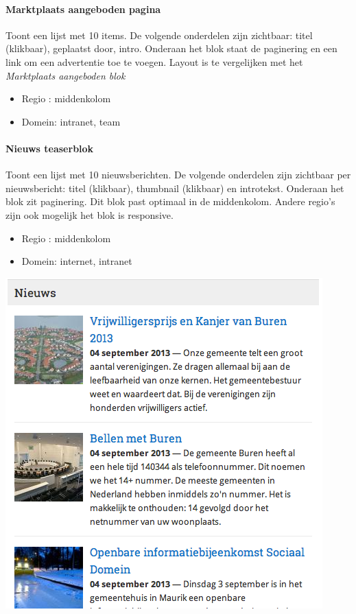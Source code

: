 \paragraph{Marktplaats aangeboden pagina}

Toont een lijst met 10 items. De volgende onderdelen zijn zichtbaar: titel (klikbaar), geplaatst door, intro. Onderaan het blok staat de paginering en een link om een advertentie toe te voegen. Layout is te vergelijken met het \emph{Marktplaats aangeboden blok}

\begin{itemize}
\item Regio : middenkolom
\item Domein: intranet, team
\end{itemize}

\paragraph{Nieuws teaserblok}

Toont een lijst met 10 nieuwsberichten. De volgende onderdelen zijn zichtbaar per nieuwsbericht: titel (klikbaar), thumbnail (klikbaar) en introtekst. Onderaan het blok zit paginering. Dit blok past optimaal in de middenkolom. Andere regio's zijn ook mogelijk het blok is responsive.

\begin{itemize}
\item Regio : middenkolom
\item Domein: internet, intranet
\end{itemize}

\begin{center}
	\includegraphics[scale=0.5]{img/blokken/nieuwsteaser.png}
\end{center}

